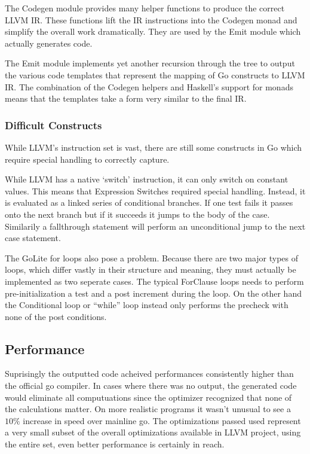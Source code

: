 \documentclass[11pt]{article}
\begin{document}
The Codegen module provides many helper functions  to produce the correct LLVM IR. These functions lift the IR instructions into the Codegen monad and simplify the overall work dramatically. They are used by the Emit module which actually generates code. 

The Emit module implements yet another recursion through the tree to output the various code templates that represent the mapping of Go constructs to LLVM IR. The combination of the Codegen helpers and Haskell's support for monads means that the templates take a form very similar to the final IR.    

\subsubsection{Difficult Constructs}

While LLVM's instruction set is vast, there are still some constructs in Go which require special handling to correctly capture. 

While LLVM has a native `switch' instruction, it can only switch on constant values. This means that Expression Switches required special handling. Instead, it is evaluated as a linked series of conditional branches. If one test fails it passes onto the next branch but if it succeeds it jumps to the body of the case. Similarily a fallthrough statement will perform an unconditional jump to the next case statement. 

The GoLite for loops also pose a problem. Because there are two major types of loops, which differ vastly in their structure and meaning, they must actually be implemented as two seperate cases. The typical ForClause loops needs to perform pre-initialization a test and a post increment during the loop. On the other hand the Conditional loop or ``while'' loop instead only performs the precheck with none of the post conditions. 

\subsection{Performance}

Suprisingly the outputted code acheived performances consistently higher than the official go compiler. In cases where there was no output, the generated code would eliminate all computuations since the optimizer recognized that none of the calculations matter. On more realistic programs it wasn't unusual to see a $10\%$ increase in speed over mainline go. The optimizations passed used represent a very small subset of the overall optimizations available in LLVM project, using the entire set, even better performance is certainly in reach. 
\end{document}
